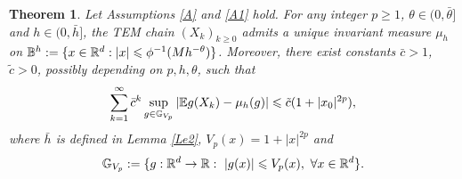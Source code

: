 \documentclass[aap]{imsart}
\theoremstyle{plain}
\newtheorem{theorem}{Theorem}[section]
\theoremstyle{definition}
\begin{document}
\begin{theorem}\label{Pro1}
Let Assumptions \ref{A} and \ref{A1} hold. For any integer $p\geqslant 1$, $\theta\in(0, \bar{\theta}]$ and $h\in(0, \bar{h}]$, the TEM chain $(X_k)_{k\geqslant 0}$  admits a unique invariant measure $\mu_h$ on \(\mathbb{B}^h:=\{x\in\mathbb{R}^d: |x|\leqslant \phi^{-1}(Mh^{-\theta})\}\). Moreover, there exist constants $\bar{c}>1$, $\tilde{c}>0$, possibly
depending on \(p,h,\theta\), such that  
\begin{equation*}
\sum_{k = 1}^{\infty}\bar{c}^k\sup_{g\in\mathbb{G}_{V_p}}|\mathbb{E} g(X_k)-\mu_h(g)|\leqslant \tilde{c}(1+|x_0|^{2p}), 
\end{equation*}
where $\bar{h}$ is defined in Lemma \ref{Le2}, $V_p(x) = 1+|x|^{2p}$ and \[\mathbb{G}_{V_p}: = \{g:\mathbb{R}^d\rightarrow\mathbb{R}:~|g(x)|\leqslant V_p(x), ~\forall x\in \mathbb{R}^d\}.\]
\end{theorem}
	
\end{document}

